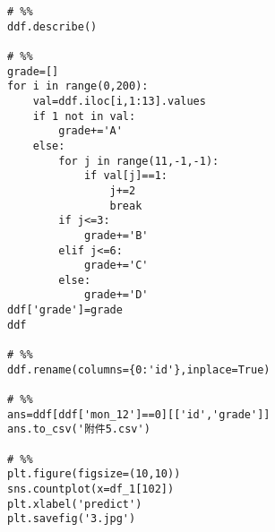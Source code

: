 \documentclass{ctexart}
\begin{document}
\begin{flushleft}
\begin{lstlisting}[caption={三、四问预测python代码}]
# %%
ddf.describe()

# %%
grade=[]
for i in range(0,200):
    val=ddf.iloc[i,1:13].values
    if 1 not in val:
        grade+='A'
    else:
        for j in range(11,-1,-1):
            if val[j]==1:
                j+=2
                break
        if j<=3:
            grade+='B'
        elif j<=6:
            grade+='C'
        else:
            grade+='D'
ddf['grade']=grade
ddf

# %%
ddf.rename(columns={0:'id'},inplace=True)

# %%
ans=ddf[ddf['mon_12']==0][['id','grade']]
ans.to_csv('附件5.csv')

# %%
plt.figure(figsize=(10,10))
sns.countplot(x=df_1[102])
plt.xlabel('predict')
plt.savefig('3.jpg')



\end{lstlisting}
\end{flushleft}

        
\end{document}
